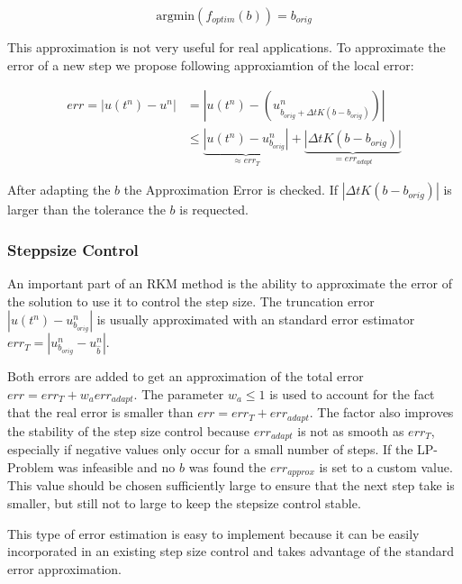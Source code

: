 \documentclass{article}
\begin{document}
\begin{equation}
\mathrm{argmin}(f_{optim}(b)) = b_{orig}
\end{equation}

This approximation is not very useful for real applications. 
To approximate the error of a new step we propose following approxiamtion of the local error:

\begin{align}
err = |u(t^n)-u^n| &= |u(t^n) - (u^n_{b_{orig}+\Delta t K(b-b_{orig})})| \\
 &\leq \underbrace{|u(t^n)-u^n_{b_{orig}}|}_{\approx err_T}+\underbrace{|\Delta t K(b-b_{orig})|}_{= err_{adapt}}
\end{align}

After adapting the $b$ the Approximation Error is checked. If $|\Delta t K(b-b_{orig})|$ is larger than the tolerance the $b$ is requected. 

\subsubsection{Steppsize Control}
An important part of an RKM method is the ability to approximate the error of the solution to use it to control the step size. 
The truncation error $|u(t^n)-u^n_{b_{orig}}|$ is usually approximated with an standard error estimator $err_T = | u^{n}_{b_{orig}} - u^{n}_{\hat{b}} |$.

Both errors are added to get an approximation of the total error $err = err_T +w_a err_{adapt}$. The parameter $w_a \leq 1$ is used to account for the fact that the real error is smaller than $err = err_T +err_{adapt}$. The factor also improves the stability of the step size control because $err_{adapt}$ is not as smooth as $err_T$, especially if negative values only occur for a small number of steps.
If the LP-Problem was infeasible and no $b$ was found the $err_{approx}$ is set to a custom value. This value should be chosen sufficiently large to ensure that the next step take is smaller, but still not to large to keep the stepsize control stable.

This type of error estimation is easy to implement because it can be easily incorporated in an existing step size control and takes advantage of the standard error approximation.

\end{document}
